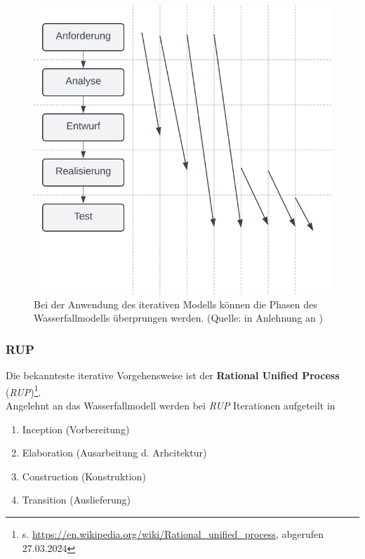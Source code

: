 \begin{figure}
    \centering
    \includegraphics[scale=0.4]{chapters/Prozessmodelle/img/iterativ}
    \caption{Bei der Anwendung des iterativen Modells können die Phasen des Wasserfallmodells überprungen werden. (Quelle: in Anlehnung an \cite[28, Abb. 3.3]{Wed09})}
    \label{fig:iterativ}
\end{figure}

\subsubsection{RUP}
Die bekannteste iterative Vorgehensweise ist der \textbf{Rational Unified Process} (\textit{RUP})\footnote{
    s. \url{https://en.wikipedia.org/wiki/Rational_unified_process}, abgerufen 27.03.2024
}.\\
Angelehnt an das Wasserfallmodell werden bei \textit{RUP} Iterationen aufgeteilt in

\begin{enumerate}
    \item Inception (Vorbereitung)
    \item Elaboration (Ausarbeitung d. Arhcitektur)
    \item Construction (Konstruktion)
    \item Transition (Auslieferung)
\end{enumerate}

